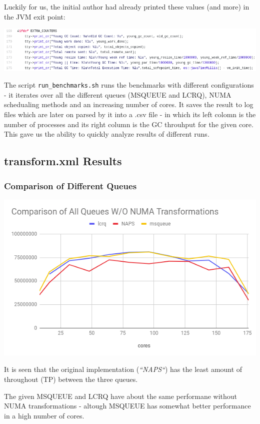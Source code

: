 \documentclass{article}
\begin{document}
 Luckily for us, the initial author had already printed these values (and more) in the JVM exit point:

 \includegraphics[width=\textwidth]{gc-debug-prints.png}

 The script \texttt{run\_benchmarks.sh} runs the benchmarks with different configurations - it iterates over all the different queues (MSQUEUE and LCRQ), NUMA schedualing methods and an increasing number of cores. It saves the result to log files which are later on parsed by it into a .csv file - in which its left colomn is the number of processes and its right column is the GC throuhput for the given core.
This gave us the ability to quickly analyze results of different runs.

 \newpage

 \subsection{transform.xml Results}
 \subsubsection{Comparison of Different Queues}

 \includegraphics[width=\textwidth]{graph-no-schedule.png}

 It is seen that the original implementation (\textit{``NAPS``}) has the least amount of throughout (TP) between the three queues. 
 
 The given MSQUEUE and LCRQ have about the same performane without NUMA transformations - altough MSQUEUE has somewhat better performance in a high number of cores. 
 
\end{document}
